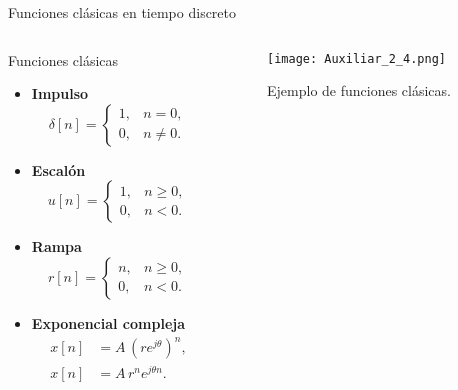 \documentclass[
    10pt,
    aspectratio=169,
    xcolor={dvipsnames},
    spanish,
    ]{beamer}
\begin{document}
\begin{frame}{Funciones clásicas en tiempo discreto}
\begin{columns}[T,onlytextwidth]
  \begin{column}{0.55\textwidth}
  \begin{block}{Funciones clásicas}
      \small
    \begin{itemize}
  \item \textbf{Impulso}
  \begin{equation}
    \delta[n]=
    \begin{cases}
      1, & n=0,\\
      0, & n\neq 0.
    \end{cases}
  \end{equation}

  \item \textbf{Escalón}
  \begin{equation}
    u[n]=
    \begin{cases}
      1, & n\ge 0,\\
      0, & n<0.
    \end{cases}
  \end{equation}

  \item \textbf{Rampa}
  \begin{equation}
    r[n]=
    \begin{cases}
      n, & n\ge 0,\\
      0, & n<0.
    \end{cases}
  \end{equation}

  \item \textbf{Exponencial compleja}
  \begin{align}
    x[n] &= A\,(re^{j\theta})^{n},\\
    x[n] &= A\,r^{n}e^{j\theta n}.
  \end{align}
\end{itemize}
    \end{block}
  \end{column}
  \begin{column}{0.4\textwidth}
    \begin{figure}
      \centering
      \texttt{[image: Auxiliar\_2\_4.png]}
  \caption{\scriptsize Ejemplo de funciones clásicas.}
    \end{figure}
  \end{column}
\end{columns}
\end{frame}
\end{document}

